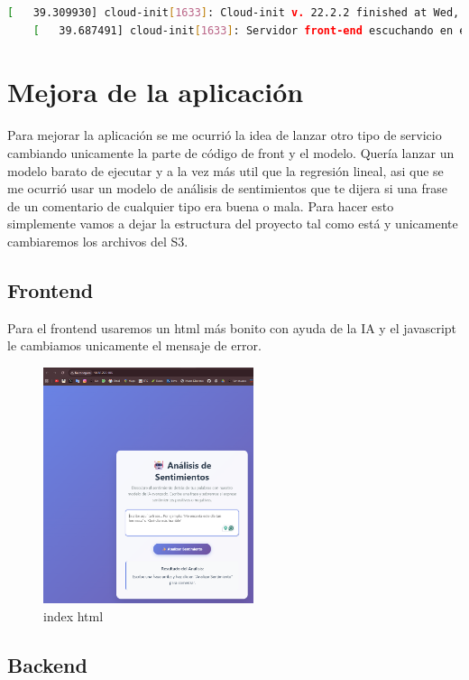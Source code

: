 \documentclass{article}
\begin{document}
 	\begin{lstlisting}[style=consola, language=bash, caption={front logs}]
	[   39.309930] cloud-init[1633]: Cloud-init v. 22.2.2 finished at Wed, 01 Oct 2025 21:42:02 +0000. Datasource DataSourceEc2.  Up 39.29 seconds
	[   39.687491] cloud-init[1633]: Servidor front-end escuchando en el puerto 80 \end{lstlisting}

	\section{Mejora de la aplicación}

	Para mejorar la aplicación se me ocurrió la idea de lanzar otro tipo de servicio cambiando unicamente la parte de código de front y el modelo. Quería lanzar un modelo barato de ejecutar y a la vez más util que la regresión lineal, asi que se me ocurrió usar un modelo de análisis de sentimientos que te dijera si una frase de un comentario de cualquier tipo era buena o mala. Para hacer esto simplemente vamos a dejar la estructura del proyecto tal como está y unicamente cambiaremos los archivos del S3.

	\subsection{Frontend}
	Para el frontend usaremos un html más bonito con ayuda de la IA y el javascript le cambiamos unicamente el mensaje de error.

			
	\begin{figure}[H]
	\centering
	\includegraphics[width=0.55\textwidth]{prueba1.png}
	\caption{index html}
	\end{figure}

	\subsection{Backend}
\end{document}
